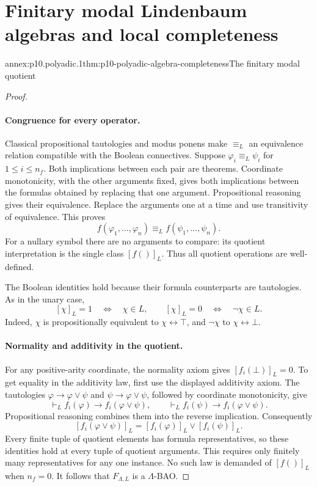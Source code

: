
\section{Finitary modal Lindenbaum algebras and local completeness}

\begin{annexitem}{annex:p10.polyadic.1}{thm:p10-polyadic-algebra-completeness}{The finitary modal quotient}
\begin{proof}
\paragraph{Congruence for every operator.}
Classical propositional tautologies and modus ponens make
\(\equiv_L\) an equivalence relation compatible with the Boolean
connectives.  Suppose \(\varphi_i\equiv_L\psi_i\) for
\(1\leq i\leq n_f\).  Both implications between each pair are
theorems.  Coordinate monotonicity, with the other arguments fixed,
gives both implications between the formulas obtained by replacing
that one argument.  Propositional reasoning gives their equivalence.
Replace the arguments one at a time and use transitivity of
equivalence.  This proves
\[
 f(\varphi_1,\ldots,\varphi_n)
           \equiv_L f(\psi_1,\ldots,\psi_n).
\]
For a nullary symbol there are no arguments to compare: its quotient
interpretation is the single class \([f()]_L\).
Thus all quotient operations are well-defined.

The Boolean identities hold because their formula counterparts are
tautologies.  As in the unary case,
\[
 [\chi]_L=1\quad\Longleftrightarrow\quad\chi\in L,
 \qquad
 [\chi]_L=0\quad\Longleftrightarrow\quad\neg\chi\in L.
\]
Indeed, \(\chi\) is propositionally equivalent to
\(\chi\leftrightarrow\top\), and \(\neg\chi\) to
\(\chi\leftrightarrow\bot\).

\paragraph{Normality and additivity in the quotient.}
For any positive-arity coordinate, the normality axiom gives
\([f_i(\bot)]_L=0\).
To get equality in the additivity law, first use the displayed
additivity axiom.  The tautologies
\(\varphi\to\varphi\vee\psi\) and
\(\psi\to\varphi\vee\psi\), followed by coordinate monotonicity,
give
\[
 \vdash_L f_i(\varphi)\to f_i(\varphi\vee\psi),\qquad
 \vdash_L f_i(\psi)\to f_i(\varphi\vee\psi).
\]
Propositional reasoning combines them into the reverse implication.
Consequently
\[
 [f_i(\varphi\vee\psi)]_L
       =[f_i(\varphi)]_L\vee[f_i(\psi)]_L.
\]
Every finite tuple of quotient elements has formula representatives,
so these identities hold at every tuple of quotient arguments.
This requires only finitely many representatives for any one instance.
No such law is demanded of \([f()]_L\) when \(n_f=0\).
It follows that \(F_{\Lambda,L}\) is a \(\Lambda\)-BAO.


\end{proof}
\end{annexitem}
